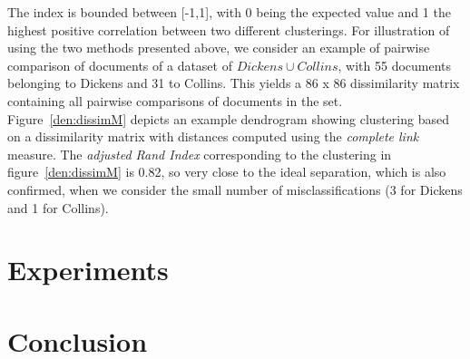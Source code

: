 \documentclass[a4paper,10pt,twoside,fleqn]{article}
\begin{document}
The index is bounded between [-1,1], with 0 being the expected value and 1 the highest positive correlation between two different clusterings. 
For illustration of using the two methods presented above, we consider an example of pairwise comparison of documents 
of a dataset of  $Dickens\cup Collins$, with 55 documents belonging to Dickens and 31 to Collins. 
This yields a 86 x 86 dissimilarity matrix containing all pairwise comparisons of documents in the set.  
Figure~\ref{den:dissimM} depicts an example dendrogram showing clustering based on a dissimilarity matrix with distances computed using the  \emph{complete link} measure. 
The \emph{adjusted Rand Index} corresponding to the clustering in figure~\ref{den:dissimM} is 0.82, so very close to the ideal separation, which is also confirmed, when we consider the small number of
misclassifications (3 for Dickens and 1 for Collins).  

 


\section{Experiments}



\section{Conclusion}









 
  

\end{document}
